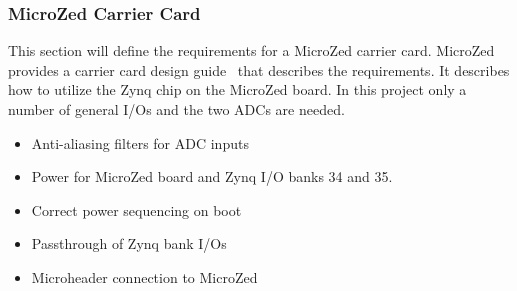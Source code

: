 \subsubsection*{MicroZed Carrier Card}
This section will define the requirements for a MicroZed carrier card.
MicroZed provides a carrier card design guide~\cite{design_carrier} that describes the requirements.
It describes how to utilize the Zynq chip on the MicroZed board.
In this project only a number of general I/Os and the two ADCs are needed.

\begin{itemize}
	\item Anti-aliasing filters for ADC inputs
	\item Power for MicroZed board and Zynq I/O banks 34 and 35.
	\item Correct power sequencing on boot
	\item Passthrough of Zynq bank I/Os
	\item Microheader connection to MicroZed
\end{itemize}


